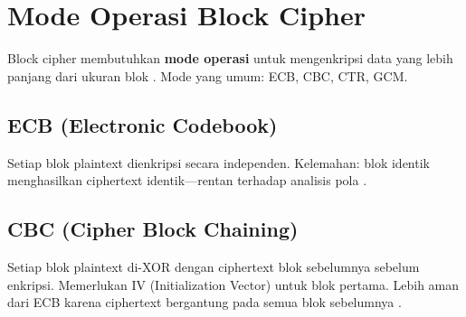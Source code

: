 \section{Mode Operasi Block Cipher}

Block cipher membutuhkan \textbf{mode operasi} untuk mengenkripsi data yang lebih panjang dari ukuran blok \cite{nistsp80038a,ferguson2010}. Mode yang umum: ECB, CBC, CTR, GCM.

\subsection{ECB (Electronic Codebook)}
Setiap blok plaintext dienkripsi secara independen. Kelemahan: blok identik menghasilkan ciphertext identik---rentan terhadap analisis pola \cite{nistsp80038a}.

\subsection{CBC (Cipher Block Chaining)}
Setiap blok plaintext di-XOR dengan ciphertext blok sebelumnya sebelum enkripsi. Memerlukan IV (Initialization Vector) untuk blok pertama. Lebih aman dari ECB karena ciphertext bergantung pada semua blok sebelumnya \cite{nistsp80038a,ferguson2010}.
